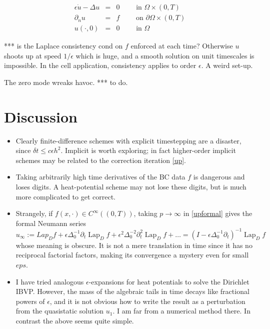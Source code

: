 \documentclass[10pt]{article}
\newcommand{\bi}{\begin{itemize}}
\newcommand{\ei}{\end{itemize}}
\newcommand{\be}{\begin{equation}}
\newcommand{\ee}{\end{equation}}
\newcommand{\bea}{\begin{eqnarray}}
\newcommand{\eea}{\end{eqnarray}}
\newcommand{\pO}{{\partial\Omega}}
\newcommand{\eps}{\epsilon}
\newcommand{\dn}{\partial_n}
\newcommand{\dt}{\partial_t}
\DeclareMathOperator{\Lap}{Lap}
\begin{document}
\bea
\eps\dot{u} - \Delta u &=& 0    \qquad \mbox{ in } \Omega\times (0,T)
\label{pden}
\\
\dn u  &=& f  \qquad \mbox{ on } \pO \times (0,T)
\label{bcn}
\\
u(\cdot, 0)    &=&  0 \qquad \mbox{ in } \Omega
\eea

*** is the Laplace consistency cond on $f$ enforced at each time?
Otherwise $u$ shoots up at speed $1/\eps$ which is huge, and
a smooth solution on unit timescales is impossible.
In the cell application, consistency applies to order $\eps$.
A weird set-up.

The zero mode wreaks havoc.
*** to do.







\section{Discussion}

\bi
\item
  Clearly finite-difference schemes with explicit timestepping are
  a disaster, since $\delta t \le c \eps h^2$.
  Implicit is worth exploring; in fact higher-order
  implicit schemes may be related to the correction iteration \eqref{up}.
\item
  Taking arbitrarily high time derivatives of the BC data $f$ is dangerous
  and loses digits. A heat-potential scheme may not lose these digits,
  but is much more complicated to get correct.
\item
Strangely, if $f(x,\cdot) \in C^\infty((0,T))$,
taking $p\to\infty$ in \eqref{upformal} gives the formal Neumann series
\be
u_\infty := Lap_D f + \eps \Delta_0^{-1} \dt \Lap_D f + \eps^2 \Delta_0^{-2} \dt^2 \Lap_D f + \dots
= (I - \eps \Delta_0^{-1} \dt)^{-1} \Lap_D f
\ee
whose meaning is obscure.
It is not a mere translation in time since it has no
reciprocal factorial factors, making its convergence a mystery
even for small $eps$.
\item
  I have tried analogous $\eps$-expansions for heat potentials
  to solve the Dirichlet IBVP.
  However, the mass of the algebraic tails in time decays like
  fractional powers of $\eps$, and it is not obvious how to
  write the result as a perturbation from the quasistatic solution $u_1$.
  I am far from a numerical method there. In contrast the above seems
  quite simple.
  \ei




\end{document}
